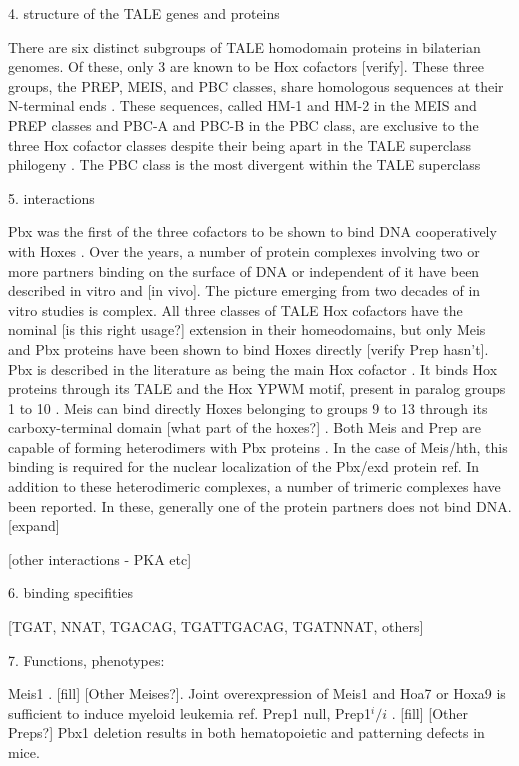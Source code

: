 	4. structure of the TALE genes and proteins
	
		There are six distinct subgroups of TALE homodomain proteins in bilaterian genomes. Of these, only 3 are known to be Hox cofactors [verify]. These three groups, the PREP, MEIS, and PBC classes, share homologous sequences at their N-terminal ends \cite{Bürglin1998}. These sequences, called HM-1 and HM-2 in the MEIS and PREP classes and PBC-A and PBC-B in the PBC class, are exclusive to the three Hox cofactor classes despite their being apart in the TALE superclass philogeny \cite{Mukherjee2007}.
		The PBC class is the most divergent within the TALE superclass

	5. interactions

		Pbx was the first of the three cofactors to be shown to bind DNA cooperatively with Hoxes \cite{ref}. Over the years, a number of protein complexes involving two or more partners binding on the surface of DNA or independent of it have been described in vitro and [in vivo]. The picture emerging from two decades of in vitro studies is complex. 
		All three classes of TALE Hox cofactors have the nominal [is this right usage?] extension in their homeodomains, but only Meis and Pbx proteins have been shown to bind Hoxes directly [verify Prep hasn't]. Pbx is described in the literature as being the main Hox cofactor \cite{ref}. It binds Hox proteins through its TALE and the Hox YPWM motif, present in paralog groups 1 to 10 \cite{refs, Passner1999}. Meis can bind directly Hoxes belonging to groups 9 to 13 through its carboxy-terminal domain [what part of the hoxes?] \cite{ref}. 
		Both Meis and Prep are capable of forming heterodimers with Pbx proteins \cite{ref}. In the case of Meis/hth, this binding is required for the nuclear localization of the Pbx/exd protein {ref}. 
		In addition to these heterodimeric complexes, a number of trimeric complexes have been reported. In these, generally one of the protein partners does not bind DNA. [expand]

		[other interactions - PKA etc]

	6. binding specifities
		
		[TGAT, NNAT, TGACAG, TGATTGACAG, TGATNNAT, others]

	7. Functions, phenotypes:

		Meis1 \cite{Azcoitia2005, Carramolino2010}. [fill] [Other Meises?]. Joint overexpression of Meis1 and Hoa7 or Hoxa9 is sufficient to induce myeloid leukemia {ref}.
		Prep1 null, Prep1$^i/i$ \cite{Ferretti2006, Fernandez-Diaz2010, Longobardi2010}. [fill] [Other Preps?]
		Pbx1 deletion results in both hematopoietic \cite{DiMartino2001} and patterning \cite{Selleri et al. 2001} defects in mice.

